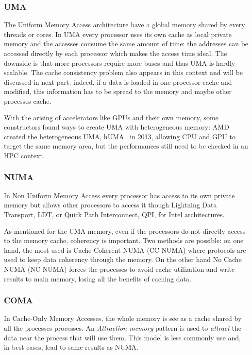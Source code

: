 \subsubsection{UMA}
The Uniform Memory Access architecture have a global memory shared by every threads or cores. 
In UMA every processor uses its own cache as local private memory and the accesses consume the same amount of time: the addresses can be accessed directly by each processor which makes the access time ideal. 
The downside is that more processors require more buses and thus UMA is hardly scalable. 
The cache consistency problem also appears in this context and will be discussed in next part: indeed, if a data is loaded in one processor cache and modified, this information has to be spread to the memory and maybe other processes cache. 

With the arising of accelerators like GPUs and their own memory, some constructors found ways to create UMA with heterogeneous memory: AMD created the heterogeneous UMA, hUMA~\cite{rogers2013amd} in 2013, allowing CPU and GPU to target the same memory area, but the performances still need to be checked in an HPC context.

\subsubsection{NUMA}
In Non Uniform Memory Access every processor has access to its own private memory but allows other processors to access it though Lightning Data Transport, LDT, or Quick Path Interconnect, QPI, for Intel architectures. 

As mentioned for the UMA memory, even if the processors do not directly access to the memory cache, coherency is important. 
Two methods are possible: on one hand, the most used is Cache-Coherent NUMA (CC-NUMA) where protocols are used to keep data coherency through the memory. 
On the other hand No Cache NUMA (NC-NUMA) forces the processes to avoid cache utilization and write results to main memory, losing all the benefits of caching data. 

\subsubsection{COMA}
In Cache-Only Memory Accesses, the whole memory is see as a cache shared by all the processes processes.
An \textit{Attraction memory} pattern is used to \textit{attract} the data near the process that will use them. 
This model is less commonly use and, in best cases, lead to same results as NUMA.

